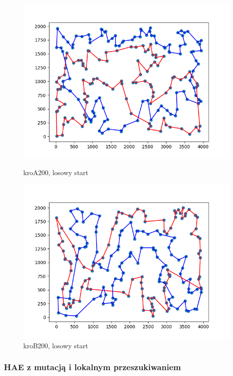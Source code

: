 \documentclass[11pt]{article}
\begin{document}
\begin{figure}[H]
    \begin{minipage}[t]{0.45\textwidth}
        \centering
        \includegraphics[width=\linewidth]{best_paths/kroA200/HAE}
        \caption{kroA200, losowy start}
    \end{minipage}
    \hfill
    \begin{minipage}[t]{0.45\textwidth}
        \centering
        \includegraphics[width=\linewidth]{best_paths/kroB200/HAE}
        \caption{kroB200, losowy start}
    \end{minipage}\label{fig:figure7}
\end{figure}


\subsubsection{HAE z mutacją i lokalnym przeszukiwaniem}
\end{document}
